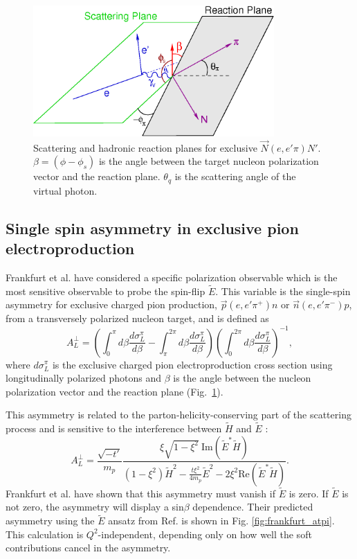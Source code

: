 \begin{figure}[hbt!]
\begin{center}
\includegraphics[height=5cm]{./figures/atpi_planes.png}
\end{center}
\caption{\label{fig:planes}
\footnotesize{
Scattering and hadronic reaction planes for exclusive $\vec{N}(e,e'\pi)N'$.
$\beta=(\phi-\phi_s)$ is the angle between the target nucleon polarization vector and the
reaction plane.  $\theta_q$ is the scattering angle of the virtual photon.}}
\end{figure}

\subsection{Single spin asymmetry in exclusive pion electroproduction}

Frankfurt et al. \cite{Fr99} have considered a specific polarization observable
which is the most sensitive observable to probe the spin-flip $\tilde{E}$.
This variable is the single-spin asymmetry for exclusive charged pion
production, $\vec{p}(e,e'\pi^+)n$ or $\vec{n}(e,e'\pi^-)p$, from a transversely
polarized nucleon target, and is defined \cite{Be01} as
\begin{equation} \label{eqn:asy}
A_L^{\perp}=(\int^{\pi}_0 d\beta \frac{d\sigma^{\pi}_L}{d\beta} -
\int^{2\pi}_{\pi} d\beta \frac{d\sigma^{\pi}_L}{d\beta})
(\int^{2\pi}_0 d\beta \frac{d\sigma^{\pi}_L}{d\beta})^{-1},
\end{equation}
where $d\sigma^{\pi}_L$ is the exclusive charged pion electroproduction cross
section using longitudinally polarized photons and $\beta$ is the angle between
the nucleon polarization vector and the reaction plane
(Fig.~\ref{fig:planes}). 

This asymmetry is related to the parton-helicity-conserving part of the
scattering process and is sensitive to the interference between $\tilde{H}$ and
$\tilde{E}$ \cite{Fr99,Di05}:
\begin{equation} \label{eqn:asy2}
A_L^{\perp}=\frac{\sqrt{-t'}}{m_p}
\frac{\xi\sqrt{1-\xi^2}\ \mathrm{Im}(\tilde{E}^*\tilde{H})}
{(1-\xi^2)\tilde{H}^2-\frac{t\xi^2}{4m_p}
\tilde{E}^2-2\xi^2\mathrm{Re}(\tilde{E}^*\tilde{H})}.
\end{equation}
Frankfurt et al. \cite{Fr99} have shown that this asymmetry must vanish if
$\tilde{E}$ is zero.  If $\tilde{E}$ is not zero, the asymmetry will display a
sin$\beta$ dependence.  Their predicted asymmetry using the $\tilde{E}$ ansatz
from Ref. \cite{Va99} is shown in Fig. \ref{fig:frankfurt_atpi}.  This
calculation is $Q^2$-independent, depending only on how well the soft
contributions cancel in the asymmetry.

